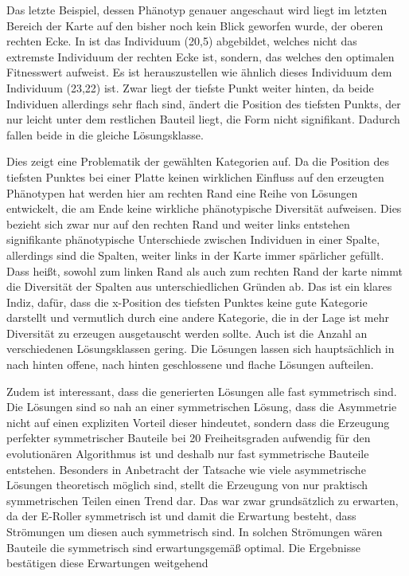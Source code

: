 
Das letzte Beispiel, dessen Phänotyp genauer angeschaut wird liegt im letzten Bereich der Karte auf den bisher noch kein Blick geworfen wurde, der oberen rechten Ecke.
In  ist das Individuum (20,5) abgebildet, welches nicht das extremste Individuum der rechten Ecke ist, sondern, das welches den optimalen Fitnesswert aufweist.
Es ist herauszustellen wie ähnlich dieses Individuum dem Individuum (23,22) ist.
Zwar liegt der tiefste Punkt weiter hinten, da beide Individuen allerdings sehr flach sind, ändert die Position des tiefsten Punkts, der nur leicht unter dem restlichen Bauteil liegt, die Form nicht signifikant.
Dadurch fallen beide in die gleiche Lösungsklasse.

Dies zeigt eine Problematik der gewählten Kategorien auf.
Da die Position des tiefsten Punktes bei einer Platte keinen wirklichen Einfluss auf den erzeugten Phänotypen hat werden hier am rechten Rand eine Reihe von Lösungen entwickelt, die am Ende keine wirkliche phänotypische Diversität aufweisen.
Dies bezieht sich zwar nur auf den rechten Rand und weiter links entstehen signifikante phänotypische Unterschiede zwischen Individuen in einer Spalte, allerdings sind die Spalten, weiter links in der Karte immer spärlicher gefüllt.
Dass heißt, sowohl zum linken Rand als auch zum rechten Rand der karte nimmt die Diversität der Spalten aus unterschiedlichen Gründen ab.
Das ist ein klares Indiz, dafür, dass die x-Position des tiefsten Punktes keine gute Kategorie darstellt und vermutlich durch eine andere Kategorie, die in der Lage ist mehr Diversität zu erzeugen ausgetauscht werden sollte.
Auch ist die Anzahl an verschiedenen Lösungsklassen gering. Die Lösungen lassen sich hauptsächlich in nach hinten offene, nach hinten geschlossene und flache Lösungen aufteilen.

Zudem ist interessant, dass die generierten Lösungen alle fast symmetrisch sind.
Die Lösungen sind so nah an einer symmetrischen Lösung, dass die Asymmetrie nicht auf einen expliziten Vorteil dieser hindeutet, sondern dass die Erzeugung perfekter symmetrischer Bauteile bei 20 Freiheitsgraden aufwendig für den evolutionären Algorithmus ist und deshalb nur fast symmetrische Bauteile entstehen.
Besonders in Anbetracht der Tatsache wie viele asymmetrische Lösungen theoretisch möglich sind, stellt die Erzeugung von nur praktisch symmetrischen Teilen einen Trend dar.
Das war zwar grundsätzlich zu erwarten, da der E-Roller symmetrisch ist und damit die Erwartung besteht, dass Strömungen um diesen auch symmetrisch sind.
In solchen Strömungen wären Bauteile die symmetrisch sind erwartungsgemäß optimal. 
Die Ergebnisse bestätigen diese Erwartungen weitgehend

